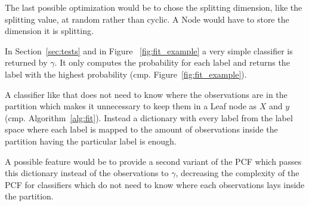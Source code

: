 The last possible optimization would be to chose the
splitting  dimension, like the splitting value, at random
rather than cyclic. A Node would have to store the
dimension it is splitting.

In Section~\ref{sec:tests} and in Figure~%
\ref{fig:fit_example} a very simple classifier is returned
by $\gamma$. It only computes the probability for each
label and returns the label with the highest probability
(cmp. Figure~\ref{fig:fit_example}).

A classifier like that does not need to know where the
observations are in the partition which makes it
unnecessary to keep them in a Leaf node as $X$ and $y$
(cmp. Algorithm~\ref{alg:fit}). Instead a dictionary with
every label from the label space where each label is mapped
to the amount of observations inside the partition having
the particular label is enough.

A possible feature would be to provide a second variant of
the PCF which passes this dictionary instead of the
observations to $\gamma$, decreasing the complexity of the
PCF for classifiers which do not need to know where each
observations lays inside the partition.

